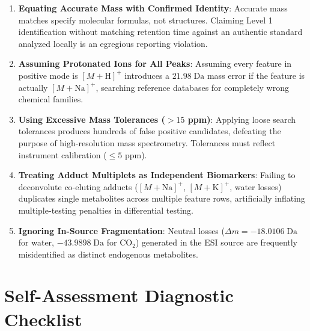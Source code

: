 \documentclass[11pt,twoside,openright]{book}
\begin{document}
\begin{enumerate}
    \item \textbf{Equating Accurate Mass with Confirmed Identity}: Accurate mass matches specify molecular formulas, not structures. Claiming Level 1 identification without matching retention time against an authentic standard analyzed locally is an egregious reporting violation.
    \item \textbf{Assuming Protonated Ions for All Peaks}: Assuming every feature in positive mode is $[M+\text{H}]^+$ introduces a $21.98\;\text{Da}$ mass error if the feature is actually $[M+\text{Na}]^+$, searching reference databases for completely wrong chemical families.
    \item \textbf{Using Excessive Mass Tolerances ($>15$ ppm)}: Applying loose search tolerances produces hundreds of false positive candidates, defeating the purpose of high-resolution mass spectrometry. Tolerances must reflect instrument calibration ($\le 5$ ppm).
    \item \textbf{Treating Adduct Multiplets as Independent Biomarkers}: Failing to deconvolute co-eluting adducts ($[M+\text{Na}]^+$, $[M+\text{K}]^+$, water losses) duplicates single metabolites across multiple feature rows, artificially inflating multiple-testing penalties in differential testing.
    \item \textbf{Ignoring In-Source Fragmentation}: Neutral losses ($\Delta m = -18.0106\;\text{Da}$ for water, $-43.9898\;\text{Da}$ for $\text{CO}_2$) generated in the ESI source are frequently misidentified as distinct endogenous metabolites.
\end{enumerate}

\section{Self-Assessment Diagnostic Checklist}
\end{document}
